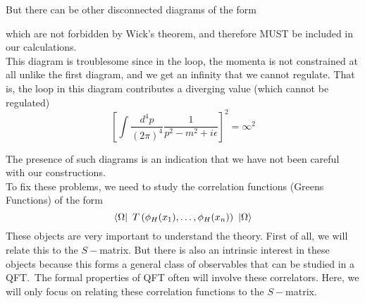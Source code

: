 \documentclass[11pt]{article}
\numberwithin{equation}{section}
\begin{document}
But there can be other disconnected diagrams of the form 
\begin{figure}[h]
    \centering
\end{figure}

which are not forbidden by Wick's theorem, and therefore MUST be included in our calculations.\\

This diagram is troublesome since in the loop, the momenta is not constrained at all unlike the first diagram, and we get an infinity that we cannot regulate. That is, the loop in this diagram contributes a diverging value (which cannot be regulated)
\begin{equation*}
    \left[ \int \frac{d^4 p}{(2\pi)^4} \frac{1}{p^2 - m^2 + i\epsilon}    \right]^2 = \infty^2
\end{equation*}

The presence of such diagrams is an indication that we have not been careful with our constructions.\\

To fix these problems, we need to study the correlation functions (Greens Functions) of the form 
\begin{equation*}
    \bra{\Omega} ~T\left( \phi_H(x_1),\ldots,\phi_H(x_n)  \right)~ \ket{\Omega}
\end{equation*}
These objects are very important to understand the theory. First of all, we will relate this to the \(S-\)matrix. But there is also an intrinsic interest in these objects because this forms a general class of observables that can be studied in a QFT.\ The formal properties of QFT often will involve these correlators. Here, we will only focus on relating these correlation functions to the \(S-\)matrix.
\end{document}
